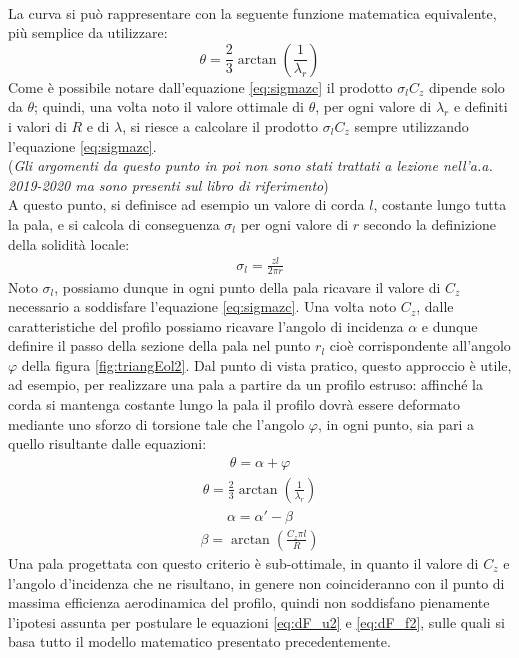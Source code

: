 \\La curva si può rappresentare con la seguente funzione matematica equivalente, più semplice da utilizzare:
\begin{equation}
\theta = \frac{2}{3} \arctan \left( \frac{1}{\lambda_r} \right)
\end{equation}
Come è possibile notare dall'equazione \ref{eq:sigmazc} il prodotto $\sigma_l C_z$ dipende solo da $\theta$; quindi, una volta noto il valore ottimale di $\theta$, per ogni valore di $\lambda_r$ e definiti i valori di $R$ e di $\lambda$, si riesce a calcolare il prodotto $\sigma_l C_z$ sempre utilizzando l'equazione \ref{eq:sigmazc}.\\
(\textit{Gli argomenti da questo punto in poi non sono stati trattati a lezione nell'a.a. 2019-2020 ma sono presenti sul libro di riferimento})\\
A questo punto, si definisce ad esempio un valore di corda $l$, costante lungo  tutta la pala, e si calcola di conseguenza $\sigma_l$ per ogni valore di $r$ secondo la definizione della solidità locale:
\begin{align*}
\sigma_l = \frac{z l}{2 \pi r}
\end{align*}
Noto $\sigma_l$, possiamo dunque in ogni punto della pala ricavare il valore di $C_z$ necessario a soddisfare l'equazione \ref{eq:sigmazc}. Una volta noto $C_z$, dalle caratteristiche del profilo possiamo ricavare l'angolo di incidenza $\alpha$ e dunque definire il passo della sezione della pala nel punto $r_l$ cioè corrispondente all'angolo $\varphi$ della figura \ref{fig:triangEol2}. Dal punto di vista pratico, questo approccio è utile, ad esempio, per realizzare una pala a partire da un profilo estruso: affinché la corda si mantenga costante lungo la pala il profilo dovrà essere deformato mediante uno sforzo di torsione tale che l'angolo $\varphi$, in ogni punto, sia pari a quello risultante dalle equazioni:
\begin{align*}
\theta = \alpha + \varphi
\end{align*}
\begin{align*}
\theta = \frac{2}{3} \arctan \left( \frac{1}{\lambda_r} \right)
\end{align*}
\begin{align*}
\alpha = \alpha' - \beta
\end{align*}
\begin{align*}
\beta = \arctan \left( \frac{C_z \pi l}{R} \right)
\end{align*}
Una pala progettata con questo criterio è sub-ottimale, in quanto il valore di $C_z$ e l'angolo d'incidenza che ne risultano, in genere non coincideranno con il punto di massima efficienza aerodinamica del profilo, quindi non soddisfano pienamente l'ipotesi assunta per postulare le equazioni \ref{eq:dF_u2} e \ref{eq:dF_f2}, sulle quali si basa tutto il modello matematico presentato precedentemente.

